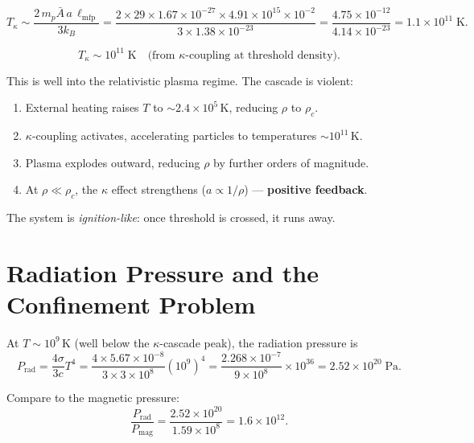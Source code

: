 \documentclass[12pt,a4paper]{article}
\begin{document}
\begin{equation}
  T_{\kappa} \sim \frac{2 \, m_p \bar{A} \, a \, \ell_{\text{mfp}}}{3 k_B}
    = \frac{2 \times 29 \times 1.67\times10^{-27} \times 4.91\times10^{15} \times 10^{-2}}
         {3 \times 1.38\times10^{-23}}
    = \frac{4.75\times10^{-12}}{4.14\times10^{-23}}
    = 1.1 \times 10^{11} \; \text{K}.
\end{equation}

\begin{equation}
  \boxed{T_{\kappa} \sim 10^{11} \; \text{K} \quad \text{(from $\kappa$-coupling at threshold density).}}
\end{equation}

This is well into the relativistic plasma regime.  The cascade is violent:
\begin{enumerate}
  \item External heating raises $T$ to $\sim 2.4\times10^5$\,K, reducing $\rho$ to $\rho_c$.
  \item $\kappa$-coupling activates, accelerating particles to temperatures $\sim 10^{11}$\,K.
  \item Plasma explodes outward, reducing $\rho$ by further orders of magnitude.
  \item At $\rho \ll \rho_c$, the $\kappa$ effect strengthens ($a \propto 1/\rho$) --- \textbf{positive feedback}.
\end{enumerate}

The system is \emph{ignition-like}: once threshold is crossed, it runs away.

\section{Radiation Pressure and the Confinement Problem}
\label{sec:confinement}

At $T \sim 10^9$\,K (well below the $\kappa$-cascade peak), the radiation pressure is
\begin{equation}
  P_{\text{rad}} = \frac{4\sigma}{3c} T^4
    = \frac{4 \times 5.67\times10^{-8}}{3 \times 3\times10^8} (10^9)^4
    = \frac{2.268\times10^{-7}}{9\times10^8} \times 10^{36}
    = 2.52 \times 10^{20} \; \text{Pa}.
\end{equation}

Compare to the magnetic pressure:
\begin{equation}
  \frac{P_{\text{rad}}}{P_{\text{mag}}} = \frac{2.52\times10^{20}}{1.59\times10^8} = 1.6 \times 10^{12}.
\end{equation}
\end{document}
